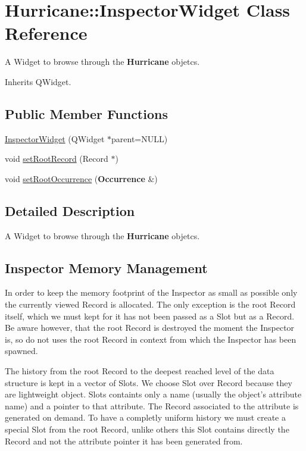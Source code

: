 \hypertarget{classHurricane_1_1InspectorWidget}{\section{Hurricane\-:\-:Inspector\-Widget Class Reference}
\label{classHurricane_1_1InspectorWidget}
}


A Widget to browse through the {\bf Hurricane} objetcs.  




Inherits Q\-Widget.

\subsection*{Public Member Functions}
\begin{DoxyCompactItemize}
\item 
\hyperlink{classHurricane_1_1InspectorWidget_a6071f331a8d27bf45103aa91981e4ebb}{Inspector\-Widget} (Q\-Widget $\ast$parent=N\-U\-L\-L)
\item 
void \hyperlink{classHurricane_1_1InspectorWidget_aebc3241d7cf15d3e2ca7478c278c6a35}{set\-Root\-Record} (Record $\ast$)
\item 
void \hyperlink{classHurricane_1_1InspectorWidget_a79914005284bdc8426c90f3440714bb4}{set\-Root\-Occurrence} ({\bf Occurrence} \&)
\end{DoxyCompactItemize}


\subsection{Detailed Description}
A Widget to browse through the {\bf Hurricane} objetcs. 

\hypertarget{classHurricane_1_1InspectorWidget_secInspectorMM}{}\subsection{Inspector Memory Management}\label{classHurricane_1_1InspectorWidget_secInspectorMM}
In order to keep the memory footprint of the Inspector as small as possible only the currently viewed Record is allocated. The only exception is the root Record itself, which we must kept for it has not been passed as a Slot but as a Record. Be aware however, that the root Record is destroyed the moment the Inspector is, so do not uses the root Record in context from which the Inspector has been spawned.

The history from the root Record to the deepest reached level of the data structure is kept in a vector of Slots. We choose Slot over Record because they are lightweight object. Slots containts only a name (usually the object's attribute name) and a pointer to that attribute. The Record associated to the attribute is generated on demand. To have a completly uniform history we must create a special Slot from the root Record, unlike others this Slot contains directly the Record and not the attribute pointer it has been generated from.

